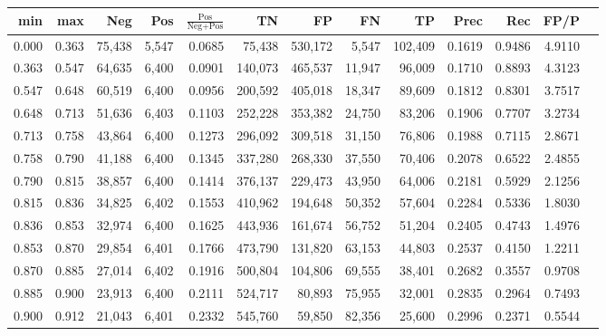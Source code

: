 \begin{tabular}{rrrrrrrrrrrrr}
\toprule
  min &   max &    Neg &   Pos & $\frac{\text{Pos}}{\text{Neg}+\text{Pos}}$ &      TN &      FP &      FN &      TP &   Prec &    Rec &   FP/P \\
\midrule
0.000 & 0.363 & 75,438 & 5,547 &                                     0.0685 &  75,438 & 530,172 &   5,547 & 102,409 & 0.1619 & 0.9486 & 4.9110 \\
0.363 & 0.547 & 64,635 & 6,400 &                                     0.0901 & 140,073 & 465,537 &  11,947 &  96,009 & 0.1710 & 0.8893 & 4.3123 \\
0.547 & 0.648 & 60,519 & 6,400 &                                     0.0956 & 200,592 & 405,018 &  18,347 &  89,609 & 0.1812 & 0.8301 & 3.7517 \\
0.648 & 0.713 & 51,636 & 6,403 &                                     0.1103 & 252,228 & 353,382 &  24,750 &  83,206 & 0.1906 & 0.7707 & 3.2734 \\
0.713 & 0.758 & 43,864 & 6,400 &                                     0.1273 & 296,092 & 309,518 &  31,150 &  76,806 & 0.1988 & 0.7115 & 2.8671 \\
0.758 & 0.790 & 41,188 & 6,400 &                                     0.1345 & 337,280 & 268,330 &  37,550 &  70,406 & 0.2078 & 0.6522 & 2.4855 \\
0.790 & 0.815 & 38,857 & 6,400 &                                     0.1414 & 376,137 & 229,473 &  43,950 &  64,006 & 0.2181 & 0.5929 & 2.1256 \\
0.815 & 0.836 & 34,825 & 6,402 &                                     0.1553 & 410,962 & 194,648 &  50,352 &  57,604 & 0.2284 & 0.5336 & 1.8030 \\
0.836 & 0.853 & 32,974 & 6,400 &                                     0.1625 & 443,936 & 161,674 &  56,752 &  51,204 & 0.2405 & 0.4743 & 1.4976 \\
0.853 & 0.870 & 29,854 & 6,401 &                                     0.1766 & 473,790 & 131,820 &  63,153 &  44,803 & 0.2537 & 0.4150 & 1.2211 \\
0.870 & 0.885 & 27,014 & 6,402 &                                     0.1916 & 500,804 & 104,806 &  69,555 &  38,401 & 0.2682 & 0.3557 & 0.9708 \\
0.885 & 0.900 & 23,913 & 6,400 &                                     0.2111 & 524,717 &  80,893 &  75,955 &  32,001 & 0.2835 & 0.2964 & 0.7493 \\
0.900 & 0.912 & 21,043 & 6,401 &                                     0.2332 & 545,760 &  59,850 &  82,356 &  25,600 & 0.2996 & 0.2371 & 0.5544 \\

\end{tabular}
